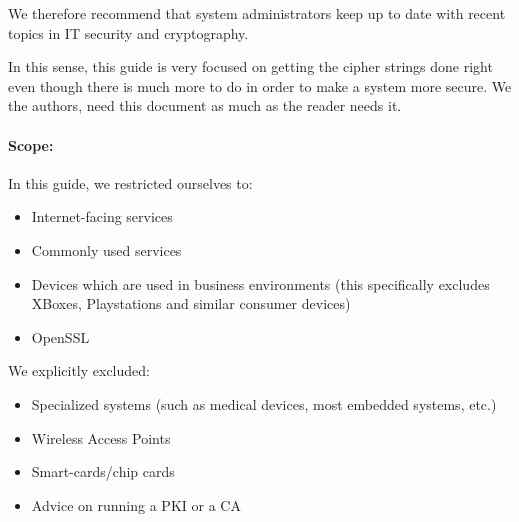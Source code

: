 We therefore recommend that system administrators keep up to date with recent
topics in IT security and cryptography. 


In this sense, this guide is very focused on getting the cipher strings done
right even though there is much more to do in order to make a system more
secure.  We the authors, need this document as much as the reader needs it.

\paragraph{Scope:}
\label{section:Scope}

In this guide, we restricted ourselves to:
\begin{itemize}
\item Internet-facing services
\item Commonly used services
\item Devices which are used in business environments (this specifically excludes XBoxes, Playstations and similar consumer devices)
\item OpenSSL 
\end{itemize}

We explicitly excluded:
\begin{itemize}
\item Specialized systems (such as medical devices, most embedded systems, etc.)
\item Wireless Access Points
\item Smart-cards/chip cards
\item Advice on running a PKI or a CA
\end{itemize}

